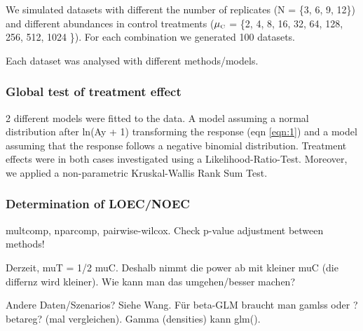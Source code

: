 \documentclass{scrartcl}\usepackage[]{graphicx}\usepackage[]{color}
\begin{document}
We simulated datasets with different the number of replicates (N = \{3, 6, 9, 12\}) and different abundances in control treatments ($\mu_\text{\tiny C}$ = \{2, 4, 8, 16, 32, 64, 128, 256, 512, 1024 \}). For each combination we generated 100 datasets.

Each dataset was analysed with different methods/models.

\subsubsection{Global test of treatment effect}
2 different models were fitted to the data. 
A model assuming a normal distribution after ln(Ay + 1) transforming the response (eqn \ref{eqn:1}) and a model assuming that the response follows a negative binomial distribution.
Treatment effects were in both cases investigated using a Likelihood-Ratio-Test.
Moreover, we applied a non-parametric Kruskal-Wallis Rank Sum Test.


\subsubsection{Determination of LOEC/NOEC}
multcomp, nparcomp, pairwise-wilcox.
Check p-value adjustment between methods!






Derzeit, muT = 1/2 muC. Deshalb nimmt die power ab mit kleiner muC (die differnz wird kleiner). Wie kann man das umgehen/besser machen?

Andere Daten/Szenarios? Siehe Wang. 
Für beta-GLM braucht man gamlss oder ?betareg? (mal vergleichen). Gamma (densities) kann glm().
\end{document}
